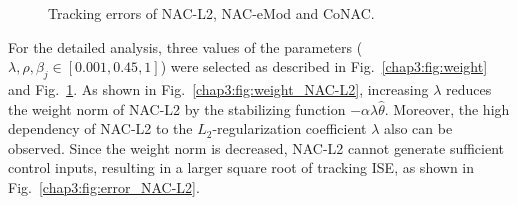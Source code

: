 \begin{figure}[!t]      
    \centering
    \vfill
    \vfill
    \vfill
    \caption{Tracking errors of NAC-L2, NAC-eMod and CoNAC.}
    \label{chap3:fig:error}
\end{figure}

For the detailed analysis, three values of the parameters (\ie $\lambda,\rho,\beta_j\in[0.001,0.45,1] \allowbreak $) were selected as described in Fig.~\ref{chap3:fig:weight} and Fig.~\ref{chap3:fig:error}.
As shown in Fig.~\ref{chap3:fig:weight_NAC-L2}, increasing $\lambda$ reduces the weight norm of NAC-L2 by the stabilizing function $-\alpha\lambda\hat\theta$.
Moreover, the high dependency of NAC-L2 to the $L_2$-regularization coefficient $\lambda$ also can be observed.
Since the weight norm is decreased, NAC-L2 cannot generate sufficient control inputs, resulting in a larger square root of tracking ISE, as shown in Fig.~\ref{chap3:fig:error_NAC-L2}.

